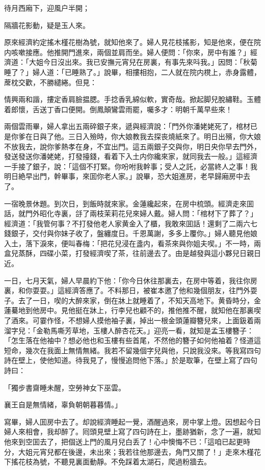 待月西廂下，迎風户半開；

隔牆花影動，疑是玉人來。

原來經濟約定搖木槿花樹為號，就知他來了。婦人見花枝搖影，知是他來，便在院内咳嗽接應。他推開門進來，兩個並肩而坐。婦人便問：「你來，房中有誰？」經濟道：「大姐今日沒出來。我已安撫元宵兒在房裏，有事先來呌我。」因問：「秋菊睡了？」婦人道：「已睡熟了。」說畢，相摟相抱，二人就在院内櫈上，赤身露體，蓆枕交歡，不勝繾綣。但見：

情興兩和諧，摟定香肩臉揾腮。手捻香乳綿似軟，實奇哉。掀起脚兒脫繡鞋。玉體着郎懷，舌送丁香口便開。倒鳳顛鸞雲雨罷，囑多才：明朝千萬早些來！

兩個雲雨畢，婦人拿出五兩碎銀子來，遞與經濟說：「門外你潘姥姥死了，棺材已是你爹在日與了他。三日入殮時，你大娘教我去探丧燒紙來了。明日出殯，你大娘不放我去，說你爹熱孝在身，不宜出門。這五兩銀子交與你，明日央你早去門外，發送發送你潘姥姥，打發擡錢，看着下入土内你纔來家，就同我去一般。」這經濟一手接了銀子，說：「這個不打緊。你吩咐我幹事；受人之託，必當終人之事！我明日絶早出門，幹畢事，來囬你老人家。」說畢，恐大姐進房，老早歸廂房中去了。

一宿晚景休題。到次日，到飯時就來家。金蓮纔起來，在房中梳頭。經濟走來囬話，就門外昭化寺裏，㧱了兩枝茉莉花兒來婦人戴。婦人問：「棺材下了葬了？」經濟道：「我管何事？不打發他老人家黄金入了櫃，我敢來囬話！還剩了二兩六七錢銀子，交付與你妹子收了，盤纏度日。千恩萬謝，多多上覆你。」婦人聽見他娘入土，落下淚來，便叫春梅：「把花兒浸在盞内，看茶來與你姐夫喫。」不一時，兩盒兒蒸酥，四碟小菜，打發經濟喫了茶，往前邊去了。由是越發與這小夥兒日親日近。

一日，七月天氣，婦人早晨約下他：「你今日休往那裏去，在房中等着，我往你房裏，和你耍耍。」這經濟答應了。不料那日，被崔本邀了他和幾個朋友，往門外耍子。去了一日，喫的大醉來家，倒在牀上就睡着了，不知天高地下。黄昏時分，金蓮驀地到他房中。見他挺在牀上，行李兒也顧不的，推他推不醒，就知他在那裏喫了酒來。可霎作怪，不想婦人摸他袖子裏，掉出一根金頭蓮瓣簪兒來，上面鈒着兩溜字兒：「金勒馬嘶芳草地，玉樓人醉杏花天。」迎亮一看，就知是孟玉樓簪子：「怎生落在他袖中？想必他也和玉樓有些首尾，不然他的簪子如何他袖着？怪道這短命，幾次在我面上無情無緒。我若不留幾個字兒與他，只說我没來。等我寫四句詩在壁上，使他知道。待我見了，慢慢追問他下落。」於是取筆，在壁上寫了四句詩曰：

「獨步書齋睡未醒，空勞神女下巫雲。

襄王自是無情緒，辜負朝朝暮暮情。」

寫畢，婦人囬房中去了。却說經濟睡起一覺，酒醒過來，房中掌上燈。因想起今日婦人來相會，我却醉了。囘頭見壁上寫了四句詩在上，墨跡猶新，念了一遍，就知他來到空囬去了，把個送上門的風月兒白丢了！心中懊悔不已：「這咱已起更時分，大姐元宵兒都在後邊，未出來；我若往他那邊去，角門又關了！」走來木槿花下搖花枝為號，不聽見裏面動靜。不免踩着太湖石，爬過粉牆去。

